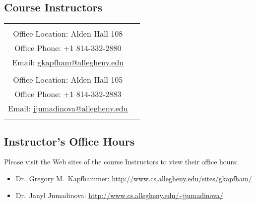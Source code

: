 


\subsection*{Course Instructors}

\begin{tabular}{c c}

\begin{minipage}{4in} 
Dr.\ Gregory M.\ Kapfhammer\\ 
\noindent Office Location: Alden Hall 108 \\
\noindent Office Phone: +1 814-332-2880 \\
\noindent Email: \url{gkapfham@allegheny.edu} \\
\end{minipage} & 

\begin{minipage}{4in} 
Dr.\ Janyl Jumadinovaa\\
\noindent Office Location: Alden Hall 105 \\
\noindent Office Phone: +1 814-332-2883 \\
\noindent Email: \url{jjumadinova@allegheny.edu} \\
\end{minipage} 

\end{tabular}

\subsection*{Instructor's Office Hours}

Please visit the Web sites of the course Instructors to view their office hours:

\begin{itemize}
	\itemsep 0em
        \item Dr.\ Gregory M.\ Kapfhammer: \url{http://www.cs.allegheny.edu/sites/gkapfham/}
        \item Dr.\ Janyl Jumadinova: \url{http://www.cs.allegheny.edu/~jjumadinova/} 
\end{itemize}

\vspace*{-.25in}
